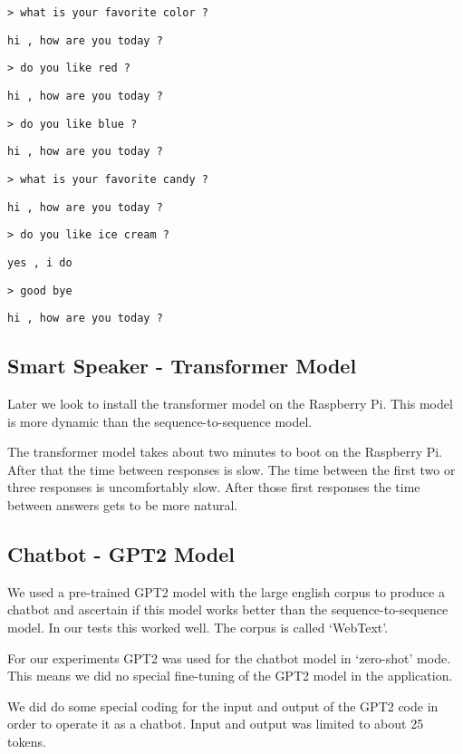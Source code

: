  \texttt{> what is your favorite color ?}

\texttt{hi , how are you today ?}

 \texttt{> do you like red ?}

\texttt{hi , how are you today ?}

 \texttt{> do you like blue ?}

\texttt{hi , how are you today ?}

 \texttt{> what is your favorite candy ?}

\texttt{hi , how are you today ?}

 \texttt{> do you like ice cream ?}

\texttt{yes , i do }

 \texttt{> good bye}

\texttt{hi , how are you today ?}




\subsection{Smart Speaker - Transformer Model}

Later we look to install the transformer model on the Raspberry Pi. This model is more dynamic than the sequence-to-sequence model. 

The transformer model takes about two minutes to boot on the Raspberry Pi. After that the time between responses is slow. The time between the first two or three responses is uncomfortably slow. After those first responses the time between answers gets to be more natural.



\subsection{Chatbot - GPT2 Model}
We used a pre-trained GPT2 model with the large english corpus to produce a chatbot and ascertain if this model works better than the sequence-to-sequence model. In our tests this worked well. The corpus is called `WebText'.

For our experiments GPT2 was used for the chatbot model in `zero-shot' mode. This means we did no
special fine-tuning of the GPT2 model in the application.

We did do some special coding for the input and output of the GPT2 code in order to operate it as
a chatbot. Input and output was limited to about 25 tokens. 

